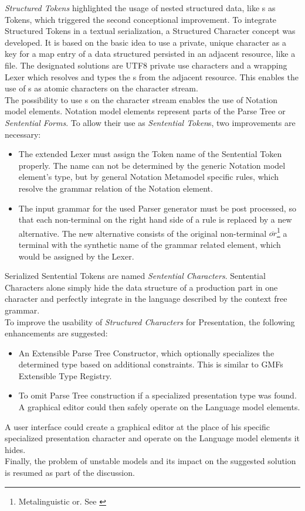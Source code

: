 \emph{Structured Tokens} highlighted the usage of nested structured data, like s as Tokens, which triggered the second conceptional improvement. To integrate Structured Tokens in a textual serialization, a Structured Character concept was developed. It is based on the basic idea to use a private, unique character as a key for a map entry of a data structured persisted in an adjacent resource, like a file. The designated solutions are UTF8 private use characters and a wrapping Lexer which resolves and types the s from the adjacent resource. This enables the use of s as atomic characters on the character stream. \\

The possibility to use s on the character stream enables the use of Notation model elements. Notation model elements represent parts of the Parse Tree or \emph{Sentential Forms}. To allow their use as \emph{Sentential Token}s, two improvements are necessary:
\begin{itemize}
	\item The extended Lexer must assign the Token name of the Sentential Token properly. The name can not be determined by the generic Notation model element's type, but by general Notation Metamodel specific rules, which resolve the grammar relation of the Notation element.
	\item The input grammar for the used Parser generator must be post processed, so that each non-terminal on the right hand side of a rule is replaced by a new alternative. The new alternative consists of the original non-terminal $\overline{or}$\footnote{\raggedright Metalinguistic or. See \cite{BNF}} a terminal with the synthetic name of the grammar related element, which would be assigned by the Lexer.
\end{itemize}
Serialized Sentential Tokens are named \emph{Sentential Characters}. Sentential Characters alone simply hide the data structure of a production part in one character and perfectly integrate in the language described by the context free grammar. \\

To improve the usability of \emph{Structured Characters} for Presentation, the following enhancements are suggested:
\begin{itemize}
	\item An Extensible Parse Tree Constructor, which optionally specializes the determined type based on additional constraints. This is similar to GMFs Extensible Type Registry.
	\item To omit Parse Tree construction if a specialized presentation type was found. A graphical editor could then safely operate on the Language model elements.
\end{itemize}
A user interface could create a graphical editor at the place of his specific specialized presentation character and operate on the Language model elements it hides.\\


Finally, the problem of unstable models and its impact on the suggested solution is resumed as part of the discussion.
